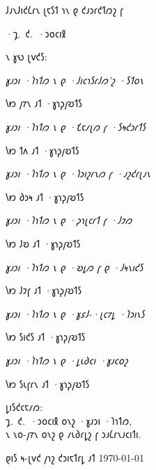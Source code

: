 \begin{center}
\vspace*{2cm}

\thispagestyle{empty}
𐑓𐑨𐑯𐑓𐑦𐑒𐑖𐑩𐑯 𐑚𐑱𐑕𐑑 𐑪𐑯 𐑞 𐑒𐑨𐑮𐑩𐑒𐑑𐑼𐑟 𐑝

\vspace*{.5cm}

\Large \MakeUppercase{·𐑡.~𐑒.~·𐑮𐑴𐑤𐑦𐑙} \normalsize

\vspace*{.5cm}

𐑯 𐑣𐑻 𐑚𐑫𐑒𐑕:

\vspace*{.5cm}

{
        \setcounter{books_list_counter}{0}

        \textit{𐑣𐑨𐑮𐑦 ·𐑐𐑪𐑑𐑼 𐑯 𐑞 ·𐑓𐑦𐑤𐑪𐑕𐑩𐑓𐑼'𐑟 ·𐑕𐑑𐑴𐑯} \par
        𐑘𐑽 𐑢𐑳𐑯 𐑨𐑑 ·𐑣𐑪𐑜𐑢𐑹𐑑𐑕 \smallskip\par

        \textit{𐑣𐑨𐑮𐑦 ·𐑐𐑪𐑑𐑼 𐑯 𐑞 ·𐑗𐑱𐑥𐑚𐑼 𐑝 ·𐑕𐑰𐑒𐑮𐑩𐑑𐑕} \par
        𐑘𐑽 𐑑𐑵 𐑨𐑑 ·𐑣𐑪𐑜𐑢𐑹𐑑𐑕 \smallskip\par

        \textit{𐑣𐑨𐑮𐑦 ·𐑐𐑪𐑑𐑼 𐑯 𐑞 ·𐑐𐑮𐑦𐑟𐑩𐑯𐑼 𐑝 ·𐑨𐑟𐑒𐑩𐑚𐑨𐑯} \par
        𐑘𐑽 𐑔𐑮𐑰 𐑨𐑑 ·𐑣𐑪𐑜𐑢𐑹𐑑𐑕 \smallskip\par

        \textit{𐑣𐑨𐑮𐑦 ·𐑐𐑪𐑑𐑼 𐑯 𐑞 ·𐑜𐑪𐑚𐑤𐑩𐑑 𐑝 ·𐑓𐑲𐑼} \par
        𐑘𐑽 𐑓𐑹 𐑨𐑑 ·𐑣𐑪𐑜𐑢𐑹𐑑𐑕 \smallskip\par

        \textit{𐑣𐑨𐑮𐑦 ·𐑐𐑪𐑑𐑼 𐑯 𐑞 ·𐑹𐑛𐑼 𐑝 𐑞 ·𐑓𐑰𐑯𐑦𐑒𐑕} \par
        𐑘𐑽 𐑓𐑲𐑝 𐑨𐑑 ·𐑣𐑪𐑜𐑢𐑹𐑑𐑕 \smallskip\par

        \textit{𐑣𐑨𐑮𐑦 ·𐑐𐑪𐑑𐑼 𐑯 𐑞 ·𐑣𐑭𐑓-·𐑚𐑤𐑳𐑛 ·𐑐𐑮𐑦𐑯𐑕} \par
        𐑘𐑽 𐑕𐑦𐑒𐑕 𐑨𐑑 ·𐑣𐑪𐑜𐑢𐑹𐑑𐑕 \smallskip\par

        \textit{𐑣𐑨𐑮𐑦 ·𐑐𐑪𐑑𐑼 𐑯 𐑞 ·𐑛𐑧𐑔𐑤𐑦 ·𐑣𐑨𐑤𐑴𐑟} \par
        𐑘𐑽 𐑕𐑧𐑝𐑩𐑯 𐑨𐑑 ·𐑣𐑪𐑜𐑢𐑹𐑑𐑕 \smallskip\par
}
\end{center}
\cleartorecto%

\newpage
\vspace*{4cm}
\begin{center}
𐑛𐑦𐑕𐑒𐑤𐑱𐑥𐑼:\\𐑡.~𐑒.~·𐑮𐑴𐑤𐑦𐑙 𐑴𐑯𐑟 ·𐑣𐑨𐑮𐑦 ·𐑐𐑪𐑑𐑼,\\𐑯 𐑯𐑴-𐑢𐑳𐑯 𐑴𐑯𐑟 𐑞 𐑥𐑧𐑔𐑩𐑛𐑟 𐑝 𐑮𐑨𐑖𐑩𐑯𐑨𐑤𐑦𐑑𐑦.
\end{center}

\vfill
𐑞𐑦𐑕 𐑰-𐑚𐑫𐑒 𐑢𐑪𐑟 𐑒𐑮𐑦𐑱𐑑𐑩𐑛 𐑨𐑑 \today{}
